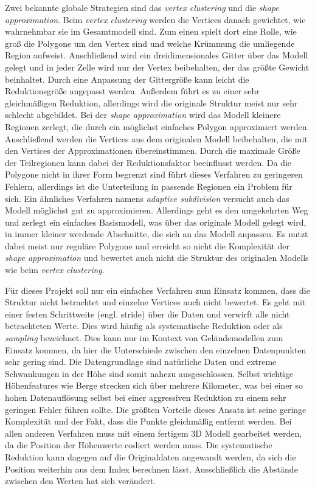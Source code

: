 Zwei bekannte globale Strategien sind das \textit{vertex clustering} und die \textit{shape approximation}. Beim \textit{vertex clustering} werden die Vertices danach gewichtet, wie wahrnehmbar sie im Gesamtmodell sind. Zum einen spielt dort eine Rolle, wie groß die Polygone um den Vertex sind und welche Krümmung die umliegende Region aufweist. Anschließend wird ein dreidimensionales Gitter über das Modell gelegt und in jeder Zelle wird nur der Vertex beibehalten, der das größte Gewicht beinhaltet. Durch eine Anpassung der Gittergröße kann leicht die Reduktionsgröße angepasst werden. Außerdem führt es zu einer sehr gleichmäßigen Reduktion, allerdings wird die originale Struktur meist nur sehr schlecht abgebildet\cite[Abschnitt 4.1]{meshSimplSurvey}. Bei der \textit{shape approximation} wird das Modell kleinere Regionen zerlegt, die durch ein möglichst einfaches Polygon approximiert werden. Anschließend werden die Vertices aus dem originalen Modell beibehalten, die mit den Vertices der Approximationen übereinstimmen. Durch die maximale Größe der Teilregionen kann dabei der Reduktionsfaktor beeinflusst werden. Da die Polygone nicht in ihrer Form begrenzt sind führt dieses Verfahren zu geringeren Fehlern, allerdings ist die Unterteilung in passende Regionen ein Problem für sich\cite[Abschnitt 4.2]{meshSimplSurvey}. Ein ähnliches Verfahren namens \textit{adaptive subdivision} versucht auch das Modell möglichst gut zu approximieren. Allerdings geht es den umgekehrten Weg und zerlegt ein einfaches Basismodell, was über das originale Modell gelegt wird, in immer kleiner werdende Abschnitte, die sich an das Modell anpassen. Es nutzt dabei meist nur reguläre Polygone und erreicht so nicht die Komplexität der \textit{shape approximation} und bewertet auch nicht die Struktur des originalen Modells wie beim \textit{vertex clustering}\cite[Abschnitt 4.1.2]{meshSimplOverview}.

Für dieses Projekt soll nur ein einfaches Verfahren zum Einsatz kommen, dass die Struktur nicht betrachtet und einzelne Vertices auch nicht bewertet. Es geht mit einer festen Schrittweite (engl. stride) über die Daten und verwirft alle nicht betrachteten Werte. Dies wird häufig als systematische Reduktion oder als \textit{sampling}\cite[Abschnitt 4.1.3]{meshSimplOverview} bezeichnet. Dies kann nur im Kontext von Geländemodellen zum Einsatz kommen, da hier die Unterschiede zwischen den einzelnen Datenpunkten sehr gering sind. Die Datengrundlage sind natürliche Daten und extreme Schwankungen in der Höhe sind somit nahezu ausgeschlossen. Selbst wichtige Höhenfeatures wie Berge strecken sich über mehrere Kilometer, was bei einer so hohen Datenauflösung selbst bei einer aggressiven Reduktion zu einem sehr geringen Fehler führen sollte. Die größten Vorteile dieses Ansatz ist seine geringe Komplexität und der Fakt, dass die Punkte gleichmäßig entfernt werden. Bei allen anderen Verfahren muss mit einem fertigem 3D Modell gearbeitet werden, da die Position der Höhenwerte codiert werden muss. Die systematische Reduktion kann dagegen auf die Originaldaten angewandt werden, da sich die Position weiterhin aus dem Index berechnen lässt. Ausschließlich die Abstände zwischen den Werten hat sich verändert.

